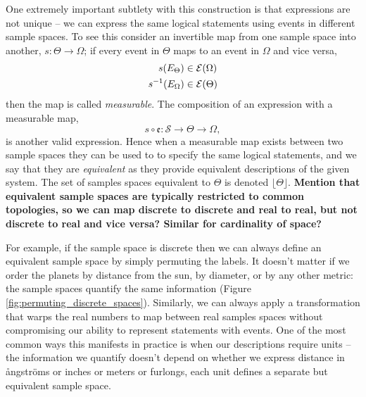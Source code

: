 One extremely important subtlety with this construction is that expressions are 
not unique -- we can express the same logical statements using events in different 
sample spaces.  To see this consider an invertible map from one sample space 
into another, $s : \Theta \rightarrow \Omega$; if every event in $\Theta$ maps 
to an event in  $\Omega$ and vice versa,
%
\begin{align*}
s \! \left( E_{\Theta} \right) &\in  \mathcal{E} \! \left( \Omega \right) 
\\
s^{-1} \! \left( E_{\Omega} \right) &\in  \mathcal{E} \! \left( \Theta \right) 
\end{align*}
%
then the map is called \emph{measurable}.  The composition of an expression
with a measurable map,
%
\begin{equation*}
s \circ \mathfrak{e} : \mathcal{S} \rightarrow \Theta \rightarrow \Omega,
\end{equation*}
%
is another valid expression.  Hence when a measurable map exists between 
two sample spaces they can be used to to specify the same logical statements,
and we say that they are \emph{equivalent} as they provide equivalent descriptions 
of the given system.  The set of samples spaces equivalent to $\Theta$ is 
denoted $\lfloor \Theta \rfloor$.  \textbf{Mention that equivalent sample
spaces are typically restricted to common topologies, so we can map
discrete to discrete and real to real, but not discrete to real and vice
versa?  Similar for cardinality of space?}

For example, if the sample space is discrete then we can always define an 
equivalent sample space by simply permuting the labels.  It doesn't matter 
if we order the planets by distance from the sun, by diameter, or by any other 
metric: the sample spaces quantify the same information (Figure
\ref{fig:permuting_discrete_spaces}).   Similarly, we can always apply a 
transformation that warps the real numbers to map between real samples spaces 
without compromising our ability to represent statements with events.  One of 
the most common ways this manifests in practice is when our descriptions require 
units -- the information we quantify doesn't depend on whether we express distance 
in {\aa}ngstr\"{o}ms or inches or meters or furlongs, each unit defines a separate 
but equivalent sample space.

